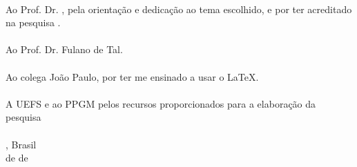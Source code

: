 
\begin{agradecimentos}

\ \\
Ao Prof. Dr. \theadvisor, pela orientação e dedicação ao tema escolhido, e por ter acreditado na pesquisa .\\
\\
Ao Prof. Dr. Fulano de Tal.\\
\\
Ao colega João Paulo, por ter me ensinado a usar o \LaTeX.\\
\\
A UEFS e ao PPGM pelos recursos proporcionados para a elaboração da pesquisa\\
\\

\noindent
\ppgmcidade, Brasil \hfill \theauthor\\
\ppgmdia\space de \ppgmmes\space de \ppgmano
\end{agradecimentos}
